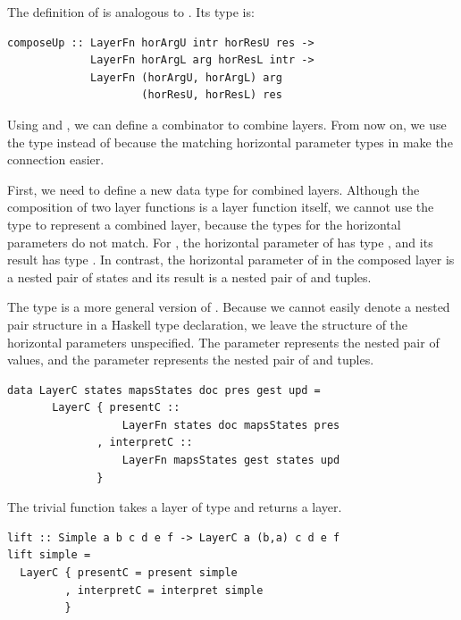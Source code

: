 \documentclass[preprint,natbib]{sigplanconf}
\begin{document}
The definition of  is analogous to . Its type is:

\begin{small}
\begin{verbatim}
composeUp :: LayerFn horArgU intr horResU res ->
             LayerFn horArgL arg horResL intr ->
             LayerFn (horArgU, horArgL) arg
                     (horResU, horResL) res
\end{verbatim}
\end{small}


Using  and , we can define a combinator to combine  layers. 
\bc From now on, we use the type  instead of  because the matching horizontal parameter types in  make the connection easier. \ec


First, we need to define a new data type for combined layers. Although the composition of two layer functions is a layer function itself, we cannot use the type  to represent a combined layer, because the types for the horizontal parameters do not match.  For , the horizontal parameter of  has type , and its result has type . In contrast, the horizontal parameter of  in the composed layer is a nested pair of states and its result is a nested pair of  and  tuples. 

The type  is a more general version of . Because we cannot easily denote a nested pair structure in a Haskell type declaration, we leave the structure of the horizontal parameters unspecified. The parameter  represents the nested pair of  values, and the parameter  represents the nested pair of  and  tuples.

\begin{small}
\begin{verbatim}
data LayerC states mapsStates doc pres gest upd =
       LayerC { presentC ::   
                  LayerFn states doc mapsStates pres
              , interpretC :: 
                  LayerFn mapsStates gest states upd
              }
\end{verbatim}
\end{small}

The trivial function  takes a layer of type  and returns a  layer.

\begin{small}
\begin{verbatim}
lift :: Simple a b c d e f -> LayerC a (b,a) c d e f
lift simple = 
  LayerC { presentC = present simple
         , interpretC = interpret simple
         }
\end{verbatim}
\end{small}
\end{document}

